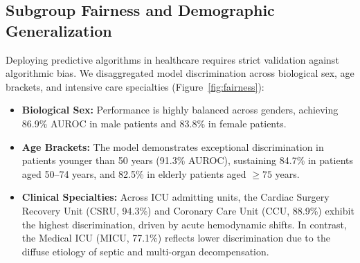 \documentclass[conference]{IEEEtran}
\begin{document}
\subsection{Subgroup Fairness and Demographic Generalization}
Deploying predictive algorithms in healthcare requires strict validation against algorithmic bias. We disaggregated model discrimination across biological sex, age brackets, and intensive care specialties (Figure~\ref{fig:fairness}):
\begin{itemize}
    \item \textbf{Biological Sex:} Performance is highly balanced across genders, achieving 86.9\% AUROC in male patients and 83.8\% in female patients.
    \item \textbf{Age Brackets:} The model demonstrates exceptional discrimination in patients younger than 50 years (91.3\% AUROC), sustaining 84.7\% in patients aged 50--74 years, and 82.5\% in elderly patients aged $\ge 75$ years.
    \item \textbf{Clinical Specialties:} Across ICU admitting units, the Cardiac Surgery Recovery Unit (CSRU, 94.3\%) and Coronary Care Unit (CCU, 88.9\%) exhibit the highest discrimination, driven by acute hemodynamic shifts. In contrast, the Medical ICU (MICU, 77.1\%) reflects lower discrimination due to the diffuse etiology of septic and multi-organ decompensation.
\end{itemize}
\end{document}
